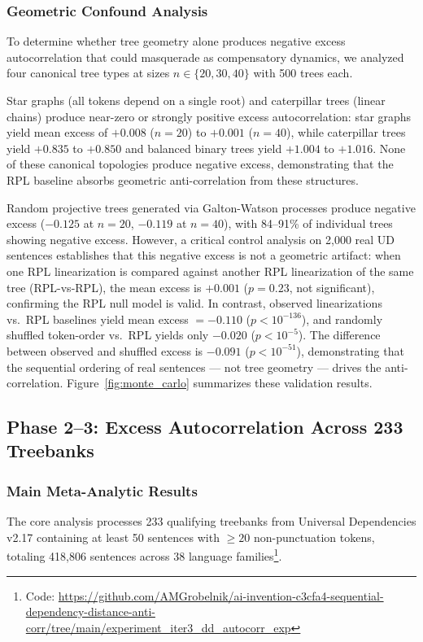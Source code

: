 \documentclass[11pt,letterpaper]{article}
\begin{document}
\subsubsection{Geometric Confound Analysis}

To determine whether tree geometry alone produces negative excess autocorrelation that could masquerade as compensatory dynamics, we analyzed four canonical tree types at sizes $n \in \{20, 30, 40\}$ with 500 trees each.

Star graphs (all tokens depend on a single root) and caterpillar trees (linear chains) produce near-zero or strongly positive excess autocorrelation: star graphs yield mean excess of $+0.008$ ($n = 20$) to $+0.001$ ($n = 40$), while caterpillar trees yield $+0.835$ to $+0.850$ and balanced binary trees yield $+1.004$ to $+1.016$. None of these canonical topologies produce negative excess, demonstrating that the RPL baseline absorbs geometric anti-correlation from these structures.

Random projective trees generated via Galton-Watson processes produce negative excess ($-0.125$ at $n = 20$, $-0.119$ at $n = 40$), with 84--91\% of individual trees showing negative excess. However, a critical control analysis on 2,000 real UD sentences establishes that this negative excess is not a geometric artifact: when one RPL linearization is compared against another RPL linearization of the same tree (RPL-vs-RPL), the mean excess is $+0.001$ ($p = 0.23$, not significant), confirming the RPL null model is valid. In contrast, observed linearizations vs.\ RPL baselines yield mean excess $= -0.110$ ($p < 10^{-136}$), and randomly shuffled token-order vs.\ RPL yields only $-0.020$ ($p < 10^{-5}$). The difference between observed and shuffled excess is $-0.091$ ($p < 10^{-51}$), demonstrating that the sequential ordering of real sentences --- not tree geometry --- drives the anti-correlation. Figure~\ref{fig:monte_carlo} summarizes these validation results.

\subsection{Phase 2--3: Excess Autocorrelation Across 233 Treebanks}
\label{sec:main_meta}

\subsubsection{Main Meta-Analytic Results}

The core analysis processes 233 qualifying treebanks from Universal Dependencies v2.17 \citep{Nivre2020} containing at least 50 sentences with $\geq 20$ non-punctuation tokens, totaling 418,806 sentences across 38 language families\footnote{Code: \url{https://github.com/AMGrobelnik/ai-invention-c3cfa4-sequential-dependency-distance-anti-corr/tree/main/experiment_iter3_dd_autocorr_exp}}.
\end{document}
